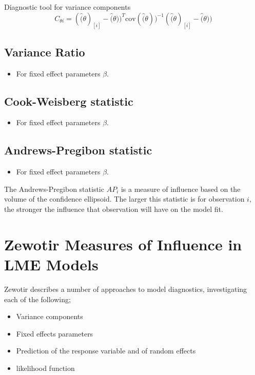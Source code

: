 \documentclass[Main.tex]{subfiles}
\begin{document}
	
	Diagnostic tool for variance components
	\[ C_{\theta i} =(\hat(\theta)_{[i]} - \hat(\theta))^{T}\mbox{cov}( \hat(\theta))^{-1}(\hat(\theta)_{[i]} - \hat(\theta))\]
	
	
	\subsection{Variance Ratio} %
	\begin{itemize}
		\item For fixed effect parameters $\beta$.
	\end{itemize}
	
	
	\subsection{Cook-Weisberg statistic} %
	\begin{itemize}
		\item For fixed effect parameters $\beta$.
	\end{itemize}
	
	
	\subsection{Andrews-Pregibon statistic} %
	\begin{itemize}
		\item For fixed effect parameters $\beta$.
	\end{itemize}
	The Andrews-Pregibon statistic $AP_{i}$ is a measure of influence based on the volume of the confidence ellipsoid.
	The larger this statistic is for observation $i$, the stronger the influence that observation will have on the model fit.
	
	
	
	
	\section{Zewotir Measures of Influence in LME Models}%
	Zewotir describes a number of approaches to model diagnostics, investigating each of the following;
	\begin{itemize}
		\item Variance components
		\item Fixed effects parameters
		\item Prediction of the response variable and of random effects
		\item likelihood function
	\end{itemize}
	
\end{document}
